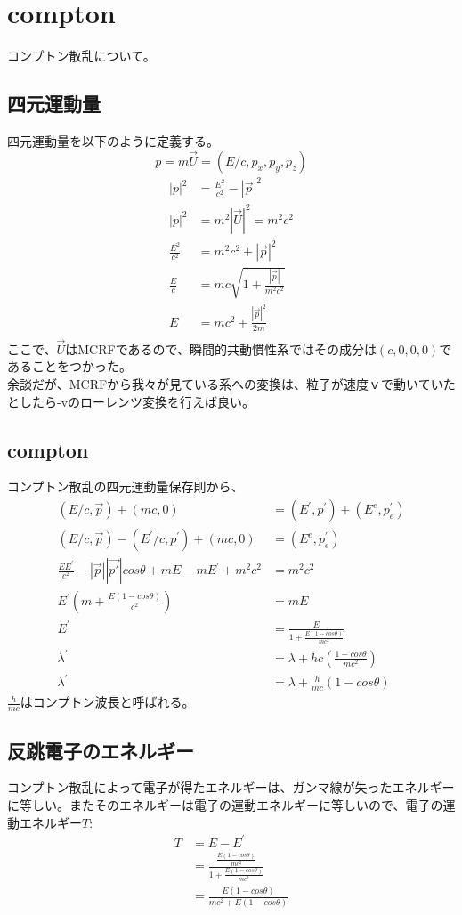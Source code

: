 \documentclass{jsarticle}
\begin{document}
\section{compton}
コンプトン散乱について。
\subsection{四元運動量}
四元運動量を以下のように定義する。
\begin{equation}
    p = m\vec{U}= (E/c, p_x, p_y, p_z)
\end{equation}
\begin{align}
    |p|^2 &= \frac{E^2}{c^2} - |\vec{p}|^2\\
    |p|^2 &= m^2 |\vec{U}|^2 = m^2c^2\\
    \frac{E^2}{c^2} &= m^2c^2 + |\vec{p}|^2\\
    \frac{E}{c} &= mc \sqrt{1 + \frac{|\vec{p}|}{m^2c^2}}\\
    E &= mc^2 + \frac{|\vec{p}|^2}{2m}\\  
\end{align}
ここで、$\vec{U}$はMCRFであるので、瞬間的共動慣性系ではその成分は$(c, 0, 0, 0)$であることをつかった。\\
余談だが、MCRFから我々が見ている系への変換は、粒子が速度ｖで動いていたとしたら-vのローレンツ変換を行えば良い。
\subsection{compton}
コンプトン散乱の四元運動量保存則から、
\begin{align}
    (E/c, \vec{p}) + (mc, 0) &= (E^\prime, p^\prime) + (E^e, p_e^\prime)\\
    (E/c, \vec{p}) -(E^\prime/c, p^\prime) +  (mc, 0) &= (E^e, p_e^\prime)\\
    \frac{EE^\prime}{c^2} - |\vec{p}||\vec{p\prime}|cos\theta + mE - mE^\prime + m^2c^2 &= m^2c^2\\
    E^\prime (m + \frac{E(1 - cos\theta)}{c^2}) &= mE\\
    E^\prime &= \frac{E}{1 + \frac{E(1 - cos\theta)}{mc^2}}\\
    \lambda^\prime &= \lambda + hc(\frac{1-cos\theta}{mc^2})\\
    \lambda^\prime &= \lambda + \frac{h}{mc}(1-cos\theta)
\end{align}
$\frac{h}{mc}$はコンプトン波長と呼ばれる。
\subsection{反跳電子のエネルギー}
コンプトン散乱によって電子が得たエネルギーは、ガンマ線が失ったエネルギーに等しい。またそのエネルギーは電子の運動エネルギーに等しいので、電子の運動エネルギー$T$:
\begin{align}
    T &= E - E^{\prime}\\
    &= \frac{\frac{E(1 - cos\theta)}{mc^2}}{1 + \frac{E(1 - cos\theta)}{mc^2}}\\
    &= \frac{E(1 - cos\theta)}{mc^2 + E(1 - cos\theta)}
\end{align}
\end{document}
